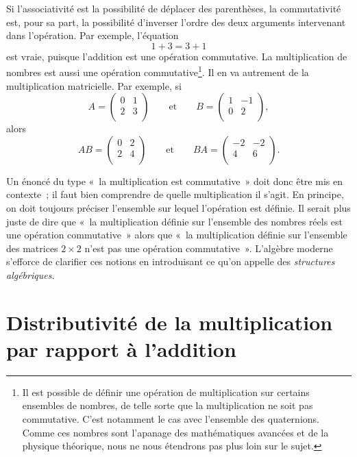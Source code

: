 \documentclass[
  letterpaper,
  DIV=11,
  numbers=noendperiod,
  oneside]{scrreprt}
\theoremstyle{definition}
\theoremstyle{remark}
\begin{document}
Si l'associativité est la possibilité de déplacer des parenthèses, la
commutativité est, pour sa part, la possibilité d'inverser l'ordre des
deux arguments intervenant dans l'opération. Par exemple, l'équation
\[1+3=3+1\] est vraie, puisque l'addition est une opération commutative.
La multiplication de nombres est aussi une opération
commutative\footnote{Il est possible de définir une opération de
  multiplication sur certains ensembles de nombres, de telle sorte que
  la multiplication ne soit pas commutative. C'est notamment le cas avec
  l'ensemble des quaternions. Comme ces nombres sont l'apanage des
  mathématiques avancées et de la physique théorique, nous ne nous
  étendrons pas plus loin sur le sujet.}. Il en va autrement de la
multiplication matricielle. Par exemple, si
\[A=\begin{pmatrix} 0 &1 \\ 2 & 3\\ \end{pmatrix}\qquad\text{et}\qquad B=\begin{pmatrix} 1 &-1 \\ 0 & 2\\\end{pmatrix},\]
alors
\[AB=\begin{pmatrix} 0 &2 \\ 2 & 4\\ \end{pmatrix}\qquad\text{et}\qquad BA=\begin{pmatrix} -2 &-2 \\ 4 & 6\\\end{pmatrix}.\]

Un énoncé du type «~la multiplication est commutative~» doit donc être
mis en contexte~; il faut bien comprendre de quelle multiplication il
s'agit. En principe, on doit toujours préciser l'ensemble sur lequel
l'opération est définie. Il serait plus juste de dire que «~la
multiplication définie sur l'ensemble des nombres réels est une
opération commutative~» alors que «~la multiplication définie sur
l'ensemble des matrices \(2\times 2\) n'est pas une opération
commutative~». L'algèbre moderne s'efforce de clarifier ces notions en
introduisant ce qu'on appelle des \emph{structures algébriques}.

\hypertarget{distributivituxe9-de-la-multiplication-par-rapport-uxe0-laddition}{%
\section{Distributivité de la multiplication par rapport à
l'addition}\label{distributivituxe9-de-la-multiplication-par-rapport-uxe0-laddition}}
\end{document}
